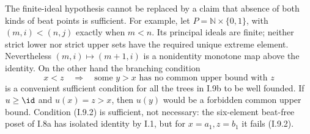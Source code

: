 The finite-ideal hypothesis cannot be replaced by a claim that
absence of both kinds of beat points is sufficient. For example,
let $P=\mathbb N\times\{0,1\}$, with
$(m,i)<(n,j)$ exactly when $m<n$. Its principal ideals are finite;
neither strict lower nor strict upper sets have the required unique
extreme element. Nevertheless $(m,i)\mapsto(m+1,i)$ is a nonidentity
monotone map above the identity. On the other hand the branching
condition
\[
 x<z\quad\Longrightarrow\quad
 \text{some }y>x\text{ has no common upper bound with }z
 \tag{I.9.2}
\]
is a convenient sufficient condition for all the trees in I.9b to
be well founded. If $u\geq\id$ and $u(x)=z>x$, then $u(y)$ would
be a forbidden common upper bound. Condition (I.9.2) is sufficient,
not necessary: the six-element beat-free poset of I.8a has isolated
identity by I.1, but for $x=a_1,z=b_1$ it fails (I.9.2).

